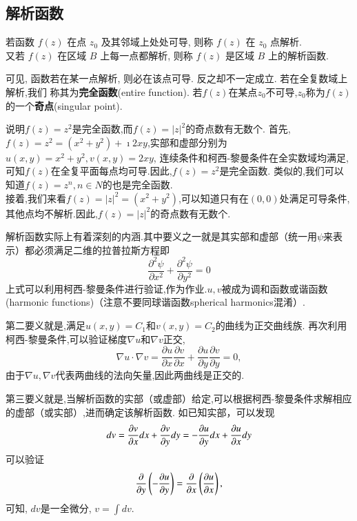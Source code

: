 \subsection{解析函数}
\begin{Definition}
若函数 $f(z)$ 在点 $z_0$ 及其邻域上处处可导, 则称 $f(z)$ 在 $z_0$ 点解析.\\
 又若 $f(z)$ 在区域 $B$ 上每一点都解析, 则称 $f(z)$ 是区域 $B$ 上的解析函数.
\end{Definition} 
 可见, 函数若在某一点解析, 则必在该点可导. 反之却不一定成立. 若在全复数域上解析,我们
 称其为{\bf 完全函数}(entire function).
 若$f(z)$在某点$z_0$不可导,$z_0$称为$f(z)$的一个{\bf 奇点}(singular point).

 \begin{examplebox}{说明$f(z)=z^2$是完全函数,而$f(z)=|z|^2$的奇点数有无数个.}
    首先,$f(z) =z^2 = (x^2 + y ^2) + \imath 2 x y$,实部和虚部分别为$u(x,y) = x^2+ y^2, v(x,y)=2x y$,
连续条件和柯西-黎曼条件在全实数域均满足,可知$f(z)$在全复平面每点均可导.因此,$f(z)=z^2$是完全函数.
类似的,我们可以知道$f(z)=z^n, n\in N$的也是完全函数.\\
    接着,我们来看$f(z) = |z|^2 = (x^2 + y ^2)$,可以知道只有在$(0,0)$处满足可导条件,其他点均不解析.因此,$f(z)=|z|^2$的奇点数有无数个.
 \end{examplebox}

 解析函数实际上有着深刻的内涵.其中要义之一就是其实部和虚部（统一用$\psi$来表示）都必须满足二维的拉普拉斯方程即
 \begin{equation}
    \label{eq:Laplace_eq}
    \frac{\partial^2 \psi}{\partial x^2}+\frac{\partial^2 \psi}{\partial y^2}=0
 \end{equation}
上式可以利用柯西-黎曼条件进行验证,作为作业.$u,v$被成为调和函数或谐函数(harmonic functions)（注意不要同球谐函数spherical harmonics混淆）.

第二要义就是,满足$u(x,y) = C_1$和$v(x,y)= C_2$的曲线为正交曲线族.
再次利用柯西-黎曼条件,可以验证梯度$\nabla u $和$\nabla v$正交,
\begin{equation}
    \nabla u \cdot \nabla v = \frac{\partial u}{\partial x} 
    \frac{\partial v}{\partial x}+\frac{\partial u}{\partial y} \frac{\partial v}{\partial y}=0 ,
\end{equation}
由于$\nabla u, \nabla v$代表两曲线的法向矢量,因此两曲线是正交的.

第三要义就是,当解析函数的实部（或虚部）给定,可以根据柯西-黎曼条件求解相应的虚部（或实部）,进而确定该解析函数.
如已知实部，可以发现
\begin{equation}
    d v = \frac{\partial{v}}{\partial{x}} dx + \frac{\partial{v}}{\partial{y}} dy = -\frac{\partial{u}}{\partial{y}} dx + \frac{\partial{u}}{\partial{x}} dy
\end{equation}
可以验证 
$$
\frac{\partial{}}{\partial{y}} \left( - \frac{\partial{u}}{\partial{y}} \right) = \frac{\partial{}}{\partial{x}} \left( \frac{\partial{u}}{\partial{x}} \right) , 
$$
可知, $dv$是一全微分, $v = \int dv$.

